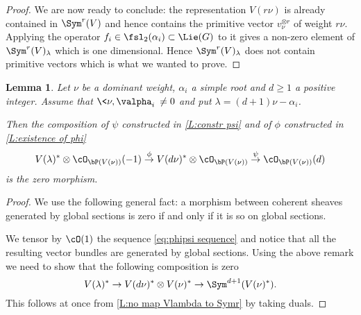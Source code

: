 \documentclass[reqno, 10pt]{amsart}
\theoremstyle{plain}
\newtheorem{lemma}[proposition]{Lemma}
\theoremstyle{definition}
\numberwithin{equation}{section}%
\begin{document}
\begin{proof}
	We are now ready to conclude: the representation $V(r\nu)$ is already contained in $\Sym^r(V)$ and hence contains the primitive vector $v_\nu^{\otimes r}$ of weight $r\nu$.
	Applying the operator $f_i\in\fsl_2(\alpha_i)\subset \Lie(G)$ to it gives a non-zero element of $\Sym^r(V)_\lambda$ which is one dimensional. 
	Hence $\Sym^r(V)_\lambda$ does not contain primitive vectors which is what we wanted to prove.
\end{proof}

\begin{lemma}\label{L:psiphi is zero}
	Let $\nu$ be a dominant weight, $\alpha_i$ a simple root and $d\ge 1$ a positive integer.
	Assume that $\<\nu,\valpha_i\>\neq 0$ and put $\lambda = (d+1)\nu-\alpha_i$.
	
	Then the composition of $\psi$ constructed in \cref{L:constr psi} and of $\phi$ constructed in \cref{L:existence of phi} 
	\begin{align}\label{eq:phipsi sequence}
		V(\lambda)^*\otimes\cO_{\bP(V(\nu))}(-1)\stackrel\phi\to V(d\nu)^*\otimes\cO_{\bP(V(\nu))}\stackrel{\psi}{\to}\cO_{\bP(V(\nu))}(d)
	\end{align}
	is the zero morphism.
\end{lemma}
\begin{proof}
	We use the following general fact: a morphism between coherent sheaves generated by global sections is zero if and only if it is so on global sections.
	
	We tensor by $\cO(1)$ the sequence \eqref{eq:phipsi sequence} and notice that all the resulting vector bundles are generated by global sections. 
	Using the above remark we need to show that the following composition is zero
	\[ V(\lambda)^*\to V(d\nu)^*\otimes V(\nu)^*\to \Sym^{d+1}(V(\nu)^*).\]
	This follows at once from \cref{L:no map Vlambda to Symr} by taking duals.
\end{proof}
\end{document}
